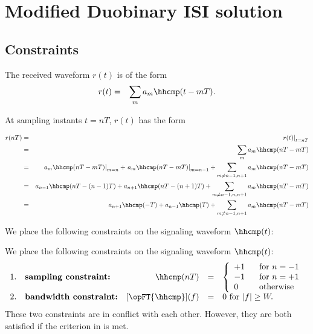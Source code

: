 \section{Modified Duobinary ISI solution}
\label{sec:isi_mduo}
\subsection{Constraints}
The received waveform $r(t)$ is of the form
\begin{eqnarray*}
   r(t) &=& \sum_m a_m \hhcmp(t-mT).
\end{eqnarray*}

At sampling instants $t=nT$, $r(t)$ has the form

\begin{eqnarray*}
   r(nT)
     &=& \left. r(t)                               \right|_{t=nT}
   \\&=& \sum_m a_m \hhcmp(nT-mT)
   \\&=& \left. a_m\hhcmp(nT-mT)\right|_{m=n}     +
         \left. a_m\hhcmp(nT-mT)\right|_{m=n-1}   +
         \sum_{m\ne n-1,n+1} a_m \hhcmp(nT-mT)
   \\&=& a_{n-1}\hhcmp(nT-(n-1)T) +
         a_{n+1}\hhcmp(nT-(n+1)T) +
         \sum_{m\ne n-1,n,n+1} a_m \hhcmp(nT-mT)
   \\&=& a_{n+1}\hhcmp(-T) +
         a_{n-1}\hhcmp(T) +
         \sum_{m\ne n-1,n+1} a_m \hhcmp(nT-mT)
\end{eqnarray*}

We place the following constraints on the signaling waveform $\hhcmp(t)$:

We place the following constraints on the signaling waveform $\hhcmp(t)$:
\[
\begin{array}{llrcl}
   1. & \mbox{\bf sampling constraint:}
      & \hhcmp(nT) &=&
          \left\{\begin{array}{l@{\hspace{4ex}}l}
            +1 &   \mbox{for } n=-1 \\
            -1 &   \mbox{for } n=+1 \\
             0 &   \mbox{otherwise}
          \end{array}\right.
\\
   2. & \mbox{\bf bandwidth constraint:}
      & [\opFT{\hhcmp}](f) &=& 0 \mbox{ for } |f|\ge W.
\end{array}
\]
These two constraints are in conflict with each other.
However, they are both satisfied if the criterion
in  is met.

